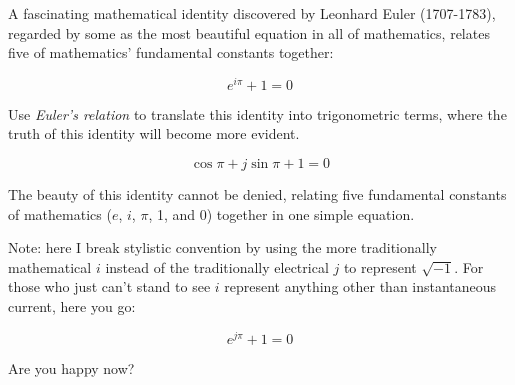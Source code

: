 

A fascinating mathematical identity discovered by Leonhard Euler (1707-1783), regarded by some as the most beautiful equation in all of mathematics, relates five of mathematics' fundamental constants together:

$$e^{i \pi} + 1 = 0$$

Use {\it Euler's relation} to translate this identity into trigonometric terms, where the truth of this identity will become more evident.







$$\cos \pi + j \sin \pi + 1 = 0$$







The beauty of this identity cannot be denied, relating five fundamental constants of mathematics ($e$, $i$, $\pi$, 1, and 0) together in one simple equation.

Note: here I break stylistic convention by using the more traditionally mathematical $i$ instead of the traditionally electrical $j$ to represent $\sqrt{-1}$.  For those who just can't stand to see $i$ represent anything other than instantaneous current, here you go:

$$e^{j \pi} + 1 = 0$$

Are you happy now?




